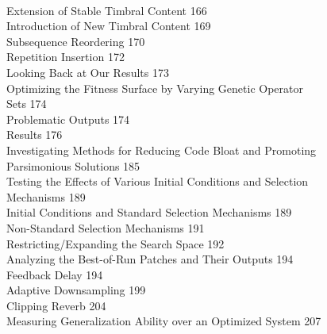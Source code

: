 \documentclass[12pt]{report} 	%
\numberwithin{figure}{chapter}
\numberwithin{table}{chapter}
\numberwithin{equation}{chapter}
\begin{document}
\\
\indent \indent \indent \indent \indent Extension of Stable Timbral Content  \hfill 166
\\
\indent \indent \indent \indent \indent Introduction of New Timbral Content \hfill 169
\\
\indent \indent \indent \indent \indent Subsequence Reordering \hfill 170
\\
\indent \indent \indent \indent \indent Repetition Insertion \hfill 172
\\
\indent \indent \indent \indent \indent Looking Back at Our Results \hfill 173
\\
\indent \indent \indent \indent Optimizing the Fitness Surface by Varying Genetic Operator \\
\indent \indent \indent \indent  \indent Sets \hfill 174
\\
\indent \indent \indent \indent \indent Problematic Outputs \hfill 174
\\
\indent \indent \indent \indent \indent Results \hfill 176
\\
\indent \indent \indent \indent Investigating Methods for Reducing Code Bloat and Promoting \\ \indent \indent \indent \indent \indent Parsimonious Solutions \hfill 185
\\
\indent \indent \indent \indent Testing the Effects of Various Initial Conditions and Selection \\ \indent \indent \indent \indent  \indent Mechanisms \hfill 189
\\
\indent \indent \indent \indent \indent Initial Conditions and Standard Selection Mechanisms \hfill 189
\\
\indent \indent \indent \indent \indent Non-Standard Selection Mechanisms \hfill 191
\\
\indent \indent \indent \indent Restricting/Expanding the Search Space \hfill 192
\\
\indent \indent \indent \indent \indent Analyzing the Best-of-Run Patches and Their Outputs \hfill 194
\\
\indent \indent \indent \indent \indent \indent Feedback Delay \hfill 194
\\
\indent \indent \indent \indent \indent \indent Adaptive Downsampling \hfill 199
\\
\indent \indent \indent \indent \indent \indent Clipping Reverb \hfill 204
\\
\indent \indent \indent \indent Measuring Generalization Ability over an Optimized System \hfill 207
\end{document}
